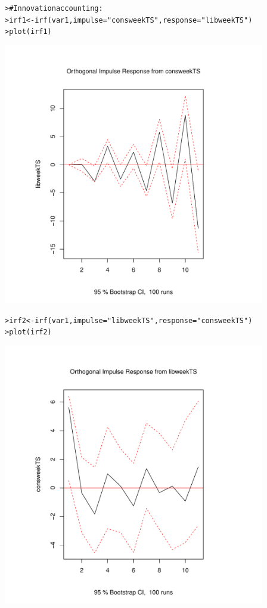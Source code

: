 \documentclass[12pt]{article}\usepackage[]{graphicx}\usepackage[]{color}
\makeatletter
\def\maxwidth{ %
  \ifdim\Gin@nat@width>\linewidth
    \linewidth
  \else
    \Gin@nat@width
  \fi
}
\newcommand{\hlstr}[1]{\textcolor[rgb]{0.82,0.78,0.62}{#1}}%
\newcommand{\hlcom}[1]{\textcolor[rgb]{0.404,0.408,0.42}{#1}}%
\newcommand{\hlstd}[1]{\textcolor[rgb]{0.882,0.878,0.898}{#1}}%
\newcommand{\hlkwb}[1]{\textcolor[rgb]{0.902,0.675,0.196}{#1}}%
\newcommand{\hlkwc}[1]{\textcolor[rgb]{0.812,0.522,0.388}{#1}}%
\newcommand{\hlkwd}[1]{\textcolor[rgb]{0.733,0.388,0.812}{#1}}%
\newenvironment{kframe}{%
 \def\at@end@of@kframe{}%
 \ifinner\ifhmode%
  \def\at@end@of@kframe{\end{minipage}}%
  \begin{minipage}{\columnwidth}%
 \fi\fi%
 \def\FrameCommand##1{\hskip\@totalleftmargin \hskip-\fboxsep
 \colorbox{shadecolor}{##1}\hskip-\fboxsep
     \hskip-\linewidth \hskip-\@totalleftmargin \hskip\columnwidth}%
 \MakeFramed {\advance\hsize-\width
   \@totalleftmargin\z@ \linewidth\hsize
   \@setminipage}}%
 {\par\unskip\endMakeFramed%
 \at@end@of@kframe}
\newenvironment{knitrout}{}{} %
\makeatother
\begin{document}
\begin{flushleft}
\begin{center}
\begin{knitrout}
\color{fgcolor}\begin{kframe}
\begin{alltt}
\hlstd{> }\hlcom{# Innovation accounting:}
\hlstd{> } \hlstd{irf1} \hlkwb{<-} \hlkwd{irf}\hlstd{(var1,} \hlkwc{impulse} \hlstd{=} \hlstr{"consweekTS"}\hlstd{,} \hlkwc{response} \hlstd{=} \hlstr{"libweekTS"}\hlstd{)}
\hlstd{> } \hlkwd{plot}\hlstd{(irf1)}
\end{alltt}
\end{kframe}
\includegraphics[width=\maxwidth,height=4.5in]{figure/inov-1} 
\begin{kframe}\begin{alltt}
\hlstd{> } \hlstd{irf2} \hlkwb{<-} \hlkwd{irf}\hlstd{(var1,} \hlkwc{impulse} \hlstd{=} \hlstr{"libweekTS"}\hlstd{,} \hlkwc{response} \hlstd{=} \hlstr{"consweekTS"}\hlstd{)}
\hlstd{> } \hlkwd{plot}\hlstd{(irf2)}
\end{alltt}
\end{kframe}
\includegraphics[width=\maxwidth,height=4.5in]{figure/inov-2} 

\end{knitrout}
\end{center}
\end{flushleft}
\end{document}
